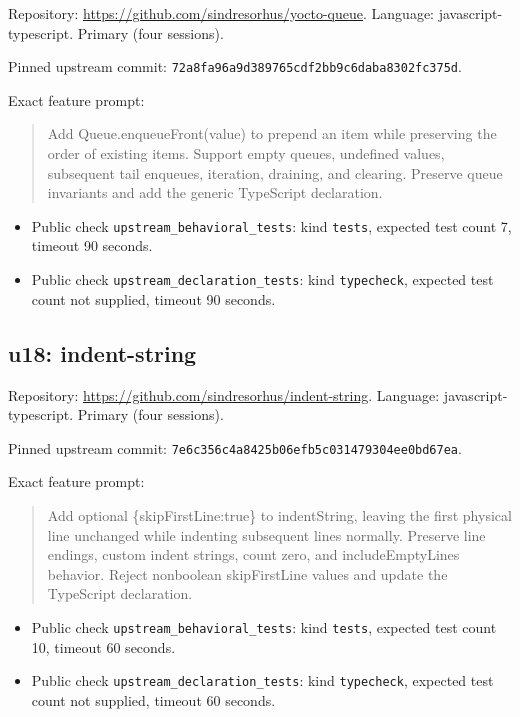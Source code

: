 \documentclass[manuscript,screen,nonacm]{acmart}
\providecommand{\tightlist}{\setlength{\itemsep}{0pt}\setlength{\parskip}{0pt}}
\begin{document}
Repository: \url{https://github.com/sindresorhus/yocto-queue}. Language:
javascript-typescript. Primary (four sessions).

Pinned upstream commit:
\nolinkurl{72a8fa96a9d389765cdf2bb9c6daba8302fc375d}.

Exact feature prompt:

\begin{quote}
Add Queue.enqueueFront(value) to prepend an item while preserving the
order of existing items. Support empty queues, undefined values,
subsequent tail enqueues, iteration, draining, and clearing. Preserve
queue invariants and add the generic TypeScript declaration.
\end{quote}

\begin{itemize}
\tightlist
\item
  Public check \nolinkurl{upstream_behavioral_tests}: kind
  \texttt{tests}, expected test count 7, timeout 90 seconds.
\item
  Public check \nolinkurl{upstream_declaration_tests}: kind
  \texttt{typecheck}, expected test count not supplied, timeout 90
  seconds.
\end{itemize}

\subsection{u18: indent-string}\label{u18-indent-string}

Repository: \url{https://github.com/sindresorhus/indent-string}.
Language: javascript-typescript. Primary (four sessions).

Pinned upstream commit:
\nolinkurl{7e6c356c4a8425b06efb5c031479304ee0bd67ea}.

Exact feature prompt:

\begin{quote}
Add optional \{skipFirstLine:true\} to indentString, leaving the first
physical line unchanged while indenting subsequent lines normally.
Preserve line endings, custom indent strings, count zero, and
includeEmptyLines behavior. Reject nonboolean skipFirstLine values and
update the TypeScript declaration.
\end{quote}

\begin{itemize}
\tightlist
\item
  Public check \nolinkurl{upstream_behavioral_tests}: kind
  \texttt{tests}, expected test count 10, timeout 60 seconds.
\item
  Public check \nolinkurl{upstream_declaration_tests}: kind
  \texttt{typecheck}, expected test count not supplied, timeout 60
  seconds.
\end{itemize}
\end{document}
